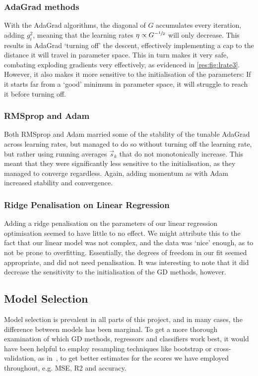     \subsubsection{AdaGrad methods}
        With the AdaGrad algorithms, the diagonal of $G$ accumulates every iteration, adding $g_i^2$, meaning that the learning rates $\eta \propto G^{-\sfrac{1}{2}}$ will only decrease. This results in AdaGrad `turning off' the descent, effectively implementing a cap to the distance it will travel in parameter space. This in turn makes it very safe, combating exploding gradients very effectively, as evidenced in \cref{res:fig:lrate3}. However, it also makes it more sensitive to the initialisation of the parameters: If it starts far from a `good' minimum in parameter space, it will struggle to reach it before turning off.

    \subsubsection{RMSprop and Adam}
        Both RMSprop and Adam married some of the stability of the tunable AdaGrad across learning rates, but managed to do so without turning off the learning rate, but rather using running averages $\vec{s}_k$ that do not monotonically increase. This meant that they were significantly less sensitive to the initialisation, as they managed to converge regardless. Again, adding momentum as with Adam increased stability and convergence. 

    \subsubsection{Ridge Penalisation on Linear Regression}
        Adding a ridge penalisation on the parameters of our linear regression optimisation seemed to have little to no effect. We might attribute this to the fact that our linear model was not complex, and the data was `nice' enough, as to not be prone to overfitting. Essentially, the degrees of freedom in our fit seemed appropriate, and did not need penalisation. It was interesting to note that it did decrease the sensitivity to the initialisation of the GD methods, however.


\subsection{Model Selection}
    Model selection is prevalent in all parts of this project, and in many cases, the difference between models has been marginal. To get a more thorough examination of which GD methods, regressors and classifiers work best, it would have been helpful to employ resampling techniques like bootstrap or cross-validation, as in~\citep{Project1}, to get better estimates for the scores we have employed throughout, e.g. MSE, R2 and accuracy.